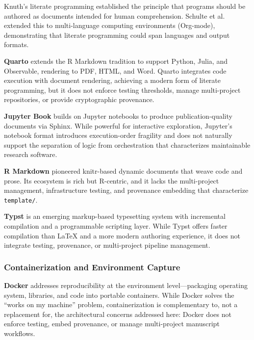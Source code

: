 \documentclass[
]{article}
\begin{document}
Knuth's literate programming \citep{knuth1984literate} established the
principle that programs should be authored as documents intended for
human comprehension. Schulte et al. \citep{schulte2012multilanguage}
extended this to multi-language computing environments (Org-mode),
demonstrating that literate programming could span languages and output
formats.

\textbf{Quarto} \citep{allaire2024quarto} extends the R Markdown
tradition to support Python, Julia, and Observable, rendering to PDF,
HTML, and Word. Quarto integrates code execution with document
rendering, achieving a modern form of literate programming, but it does
not enforce testing thresholds, manage multi-project repositories, or
provide cryptographic provenance.

\textbf{Jupyter Book} \citep{kluyver2016jupyter} builds on Jupyter
notebooks to produce publication-quality documents via Sphinx. While
powerful for interactive exploration, Jupyter's notebook format
introduces execution-order fragility \citep{pimentel2019jupyter} and
does not naturally support the separation of logic from orchestration
that characterizes maintainable research software.

\textbf{R Markdown} \citep{xie2018dynamic} pioneered knitr-based dynamic
documents that weave code and prose. Its ecosystem is rich but
R-centric, and it lacks the multi-project management, infrastructure
testing, and provenance embedding that characterize \texttt{template/}.

\textbf{Typst} \citep{madje2023typst} is an emerging markup-based
typesetting system with incremental compilation and a programmable
scripting layer. While Typst offers faster compilation than LaTeX and a
more modern authoring experience, it does not integrate testing,
provenance, or multi-project pipeline management.

\subsubsection{Containerization and Environment
Capture}\label{containerization-and-environment-capture}

\textbf{Docker} \citep{boettiger2015docker} addresses reproducibility at
the environment level---packaging operating system, libraries, and code
into portable containers. While Docker solves the ``works on my
machine'' problem, containerization is complementary to, not a
replacement for, the architectural concerns addressed here: Docker does
not enforce testing, embed provenance, or manage multi-project
manuscript workflows.
\end{document}
